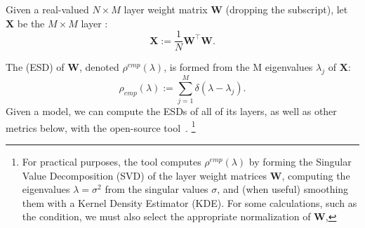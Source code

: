 Given a real-valued $N\times M$ layer weight matrix $\mathbf{W}$ (dropping the subscript), let $\mathbf{X}$ be the $M \times M$ layer \emph{\CorrelationMatrix}:
\begin{equation}
\mathbf{X}:=\dfrac{1}{N}\mathbf{W}^{\top}\mathbf{W} .
\label{eqn:X}
\end{equation}

\noindent
The \EmpiricalSpectralDensity (ESD) of $\mathbf{W}$, denoted $\rho^{emp}(\lambda)$, is formed from the M eigenvalues $\lambda_{j}$ of $\mathbf{X}$:
\begin{equation}
\rho_{emp}(\lambda):=\sum_{j=1}^{M}\delta(\lambda-\lambda_{j}) .
\label{eqn:rho}
\end{equation}
Given a model, we can compute the ESDs of all of its layers, as well as other metrics below,
with the open-source \WW tool~\cite{WW}.%
\footnote{For practical purposes, the \WW tool computes $\rho^{emp}(\lambda)$ by forming the Singular Value Decomposition (SVD) of the layer weight matrices $\mathbf{W}$,
computing the eigenvalues $\lambda=\sigma^{2}$ from the singular values $\sigma$, and (when useful) smoothing them with a Kernel Density Estimator (KDE). 
For some calculations, such as the \TRACELOG condition, we must also select the appropriate normalization of $\mathbf{W}$,
}

